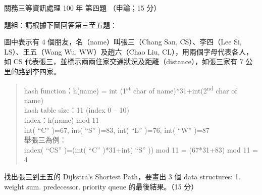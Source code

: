 \begin{pastexam}[label={px:gw3-100-ds-04}]{關務三等資訊處理 100 年 第四題}
（申論；15 分）

題組：請根據下圖回答第三至五題：

圖中表示有 4 個朋友，名（name）叫張三（Chang San, CS）、李四（Lee Si, LS）、王五（Wang Wu, WW）及趙六（Chao Liu, CL），用兩個字母代表各人，如 CS 代表張三，並標示兩兩住家交通狀況及距離（distance），如張三家有 7 公里的路到李四家。
\begin{center}
\end{center}
\begin{quote}
hash function：h(name) = int (1\textsuperscript{st} char of name)*31+int(2\textsuperscript{nd} char of name)\\
hash table size：11 \quad (index 0 – 10)\\
index：h(name) mod 11\\
int( “C” )=67, int( “S” )=83, int( “L” )=76, int( “W” )=87\\
舉張三為例：\\
index( “CS” )=(int( “C” )*31+int( “S” )) mod 11 = (67*31+83) mod 11 = 4
\end{quote}

找出張三到王五的 Dijkstra's Shortest Path，要畫出 3 個 data structures: 1. weight sum. predecessor. priority queue 的最後結果。（15 分）
\end{pastexam}

